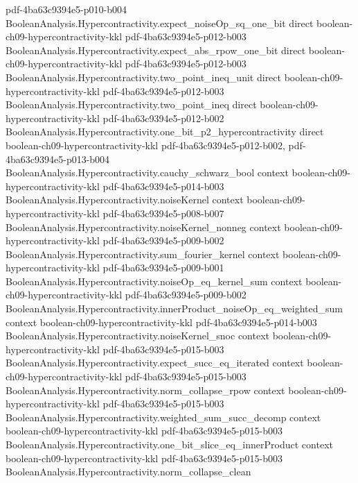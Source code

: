 \begin{theorem}
  {pdf-4ba63c9394e5-p010-b004}
\proofstep
  {BooleanAnalysis.Hypercontractivity.expect_noiseOp_sq_one_bit}
  {direct}
  {boolean-ch09-hypercontractivity-kkl}
  {pdf-4ba63c9394e5-p012-b003}
\proofstep
  {BooleanAnalysis.Hypercontractivity.expect_abs_rpow_one_bit}
  {direct}
  {boolean-ch09-hypercontractivity-kkl}
  {pdf-4ba63c9394e5-p012-b003}
\proofstep
  {BooleanAnalysis.Hypercontractivity.two_point_ineq_unit}
  {direct}
  {boolean-ch09-hypercontractivity-kkl}
  {pdf-4ba63c9394e5-p012-b003}
\proofstep
  {BooleanAnalysis.Hypercontractivity.two_point_ineq}
  {direct}
  {boolean-ch09-hypercontractivity-kkl}
  {pdf-4ba63c9394e5-p012-b002}
\proofstep
  {BooleanAnalysis.Hypercontractivity.one_bit_p2_hypercontractivity}
  {direct}
  {boolean-ch09-hypercontractivity-kkl}
  {pdf-4ba63c9394e5-p012-b002,
    pdf-4ba63c9394e5-p013-b004}
\proofstep
  {BooleanAnalysis.Hypercontractivity.cauchy_schwarz_bool}
  {context}
  {boolean-ch09-hypercontractivity-kkl}
  {pdf-4ba63c9394e5-p014-b003}
\proofstep
  {BooleanAnalysis.Hypercontractivity.noiseKernel}
  {context}
  {boolean-ch09-hypercontractivity-kkl}
  {pdf-4ba63c9394e5-p008-b007}
\proofstep
  {BooleanAnalysis.Hypercontractivity.noiseKernel_nonneg}
  {context}
  {boolean-ch09-hypercontractivity-kkl}
  {pdf-4ba63c9394e5-p009-b002}
\proofstep
  {BooleanAnalysis.Hypercontractivity.sum_fourier_kernel}
  {context}
  {boolean-ch09-hypercontractivity-kkl}
  {pdf-4ba63c9394e5-p009-b001}
\proofstep
  {BooleanAnalysis.Hypercontractivity.noiseOp_eq_kernel_sum}
  {context}
  {boolean-ch09-hypercontractivity-kkl}
  {pdf-4ba63c9394e5-p009-b002}
\proofstep
  {BooleanAnalysis.Hypercontractivity.innerProduct_noiseOp_eq_weighted_sum}
  {context}
  {boolean-ch09-hypercontractivity-kkl}
  {pdf-4ba63c9394e5-p014-b003}
\proofstep
  {BooleanAnalysis.Hypercontractivity.noiseKernel_snoc}
  {context}
  {boolean-ch09-hypercontractivity-kkl}
  {pdf-4ba63c9394e5-p015-b003}
\proofstep
  {BooleanAnalysis.Hypercontractivity.expect_succ_eq_iterated}
  {context}
  {boolean-ch09-hypercontractivity-kkl}
  {pdf-4ba63c9394e5-p015-b003}
\proofstep
  {BooleanAnalysis.Hypercontractivity.norm_collapse_rpow}
  {context}
  {boolean-ch09-hypercontractivity-kkl}
  {pdf-4ba63c9394e5-p015-b003}
\proofstep
  {BooleanAnalysis.Hypercontractivity.weighted_sum_succ_decomp}
  {context}
  {boolean-ch09-hypercontractivity-kkl}
  {pdf-4ba63c9394e5-p015-b003}
\proofstep
  {BooleanAnalysis.Hypercontractivity.one_bit_slice_eq_innerProduct}
  {context}
  {boolean-ch09-hypercontractivity-kkl}
  {pdf-4ba63c9394e5-p015-b003}
\proofstep
  {BooleanAnalysis.Hypercontractivity.norm_collapse_clean}

\end{theorem}
